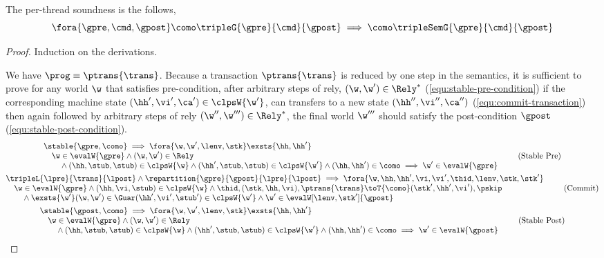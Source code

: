 \begin{theorem}
\label{thm:per-thread-soundness}
The per-thread soundness is the follows,
\[
    \fora{\gpre, \cmd, \gpost}
    \como \tripleG{\gpre}{\cmd}{\gpost} 
    \implies 
    \como \tripleSemG{\gpre}{\cmd}{\gpost} 
\]
\end{theorem}
\begin{proof}
Induction on the derivations.


We have \( \prog \equiv \ptrans{\trans} \).
Because a transaction \( \ptrans{\trans} \) is reduced by one step in the semantics, it is sufficient to prove for any world \(\w\) that satisfies pre-condition, after arbitrary steps of rely, \ie \( (\w, \w') \in \Rely^{*} \) (\cref{equ:stable-pre-condition}) if the corresponding machine state \((\hh',\vi', \ca') \in \clpsW{\w'}\), can transfers to a new state \((\hh'',\vi'', \ca'')\) (\cref{equ:commit-transaction}) then again followed by arbitrary steps of rely \((\w'',\w''') \in \Rely^{*} \), the final world \( \w''' \) should satisfy the post-condition \(\gpost\) (\cref{equ:stable-post-condition}).
\begin{gather}
    \begin{array}{@{}l}
    \stable{\gpre, \como}  
    \implies 
    \fora{\w, \w',\lenv, \stk}  
    \exsts{ \hh, \hh' } \\
    \quad \w \in \evalW{\gpre} 
    \land (\w, \w') \in \Rely \\
    \qquad {} \land (\hh, \stub, \stub) \in \clpsW{\w}
    \land (\hh', \stub, \stub) \in \clpsW{\w'}
    \land (\hh, \hh') \in \como
    \implies \w' \in \evalW{\gpre} 
    \end{array} \tag{Stable Pre} \label{equ:stable-pre-condition} \\
%
    \begin{array}{@{}l}
    \tripleL{\lpre}{\trans}{\lpost}
    \land \repartition{\gpre}{\gpost}{\lpre}{\lpost}
    \implies 
    \fora{\w, \hh, \hh', \vi, \vi', \thid, \lenv, \stk, \stk'} \\
    \quad \w \in \evalW{\gpre}
    \land (\hh, \vi, \stub) \in \clpsW{\w} 
    \land \thid, (\stk, \hh, \vi), \ptrans{\trans} 
    \toT{\como} (\stk', \hh', \vi'), \pskip  \\
    \qquad {} \land \exsts{\w'}
    (\w, \w') \in \Guar
    (\hh', \vi', \stub') \in \clpsW{\w'} 
    \land \w' \in \evalW[\lenv, \stk']{\gpost} 
    \end{array} \label{equ:commit-transaction} \tag{Commit} \\
%
    \begin{array}{@{}l}
    \stable{\gpost, \como}  
    \implies 
    \fora{\w, \w',\lenv, \stk}  
    \exsts{ \hh, \hh' } \\
    \quad \w \in \evalW{\gpre} 
    \land (\w, \w') \in \Rely \\
    \qquad {} \land (\hh, \stub, \stub) \in \clpsW{\w}
    \land (\hh', \stub, \stub) \in \clpsW{\w'}
    \land (\hh, \hh') \in \como
    \implies \w' \in \evalW{\gpost} 
    \end{array} \tag{Stable Post} \label{equ:stable-post-condition} 
\end{gather}


\end{proof}

